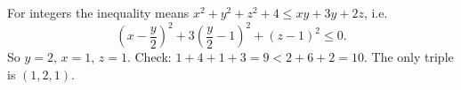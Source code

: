 For integers the inequality means $x^2+y^2+z^2+4\le xy+3y+2z$, i.e.
\[\left(x-\dfrac y2\right)^2+3\left(\dfrac y2-1\right)^2+(z-1)^2\le0.\]
So $y=2$, $x=1$, $z=1$. Check: $1+4+1+3=9<2+6+2=10$. The only triple is $\boxed{(1,2,1)}$.
